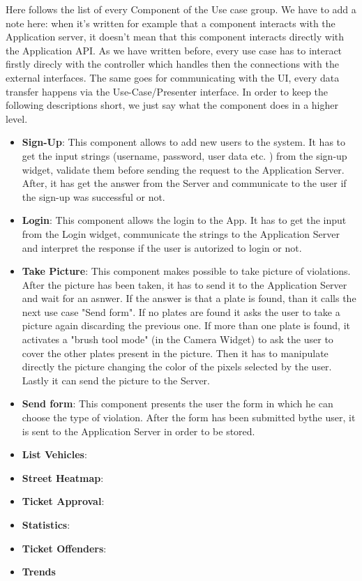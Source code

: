 Here follows the list of every Component of the Use case group. We have to add a note here: when it's written for example that a component interacts with the Application server, it doesn't mean that this component interacts directly with the Application API. As we have written before, every use case has to interact firstly direcly with the controller which handles then the connections with the external interfaces. The same goes for communicating with the UI, every data transfer happens via the Use-Case/Presenter interface. In order to keep the following descriptions short, we just say what the component does in a higher level.


\begin{itemize}
  \item \textbf{Sign-Up}: This component allows to add new users to the system. It has to get the input strings (username, password, user data etc. ) from the sign-up widget, validate them before sending the request to the Application Server. After, it has get the answer from the Server and communicate to the user if the sign-up was successful or not.
  \item \textbf{Login}: This component allows the login to the App. It has to get the input from the Login widget, communicate the strings to the Application Server and interpret the response if the user is autorized to login or not.
  \item \textbf{Take Picture}: This component makes possible to take picture of violations. After the picture has been taken, it has to send it to the Application Server and wait for an asnwer. If the answer is that a plate is found, than it calls the next use case "Send form". If no plates are found it asks the user to take a picture again discarding the previous one. If more than one plate is found, it activates a "brush tool mode" (in the Camera Widget) to ask the user to cover the other plates present in the picture. Then it has to manipulate directly the picture changing the color of the pixels selected by the user. Lastly it can send the picture to the Server.
    \item \textbf{Send form}: This component presents the user the form in which he can choose the type of violation. After the form has been submitted bythe user, it is sent to the Application Server in order to be stored.

  \item \textbf{List Vehicles}:
  \item \textbf{Street Heatmap}:
  \item \textbf{Ticket Approval}:
  \item \textbf{Statistics}:
  \item \textbf{Ticket Offenders}:
  \item \textbf{Trends}
\end{itemize}




